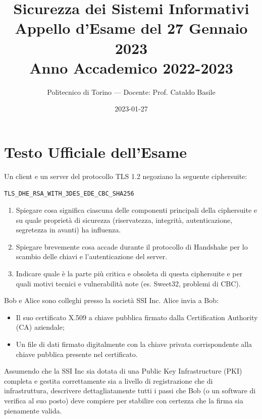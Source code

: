 \documentclass[11pt,a4paper]{article}
\begin{document}
\title{\textbf{Sicurezza dei Sistemi Informativi} \\ \large Appello d'Esame del 27 Gennaio 2023 \\ \small Anno Accademico 2022-2023}
\author{Politecnico di Torino --- Docente: Prof. Cataldo Basile}
\date{2023-01-27}
\maketitle


\section{Testo Ufficiale dell'Esame}

\begin{questionbox}
Un client e un server del protocollo TLS 1.2 negoziano la seguente ciphersuite:
\begin{center}
\texttt{TLS\_DHE\_RSA\_WITH\_3DES\_EDE\_CBC\_SHA256}
\end{center}
\begin{enumerate}[label=\alph*.]
    \item Spiegare cosa significa ciascuna delle componenti principali della ciphersuite e su quale propriet\`a di sicurezza (riservatezza, integrit\`a, autenticazione, segretezza in avanti) ha influenza.
    \item Spiegare brevemente cosa accade durante il protocollo di Handshake per lo scambio delle chiavi e l'autenticazione del server.
    \item Indicare quale \`e la parte pi\`u critica e obsoleta di questa ciphersuite e per quali motivi tecnici e vulnerabilit\`a note (es. Sweet32, problemi di CBC).
\end{enumerate}
\end{questionbox}

\begin{questionbox}
Bob e Alice sono colleghi presso la societ\`a SSI Inc. Alice invia a Bob:
\begin{itemize}
    \item Il suo certificato X.509 a chiave pubblica firmato dalla Certification Authority (CA) aziendale;
    \item Un file di dati firmato digitalmente con la chiave privata corrispondente alla chiave pubblica presente nel certificato.
\end{itemize}
Assumendo che la SSI Inc sia dotata di una Public Key Infrastructure (PKI) completa e gestita correttamente sia a livello di registrazione che di infrastruttura, descrivere dettagliatamente tutti i passi che Bob (o un software di verifica al suo posto) deve compiere per stabilire con certezza che la firma sia pienamente valida.
\end{questionbox}
\end{document}
